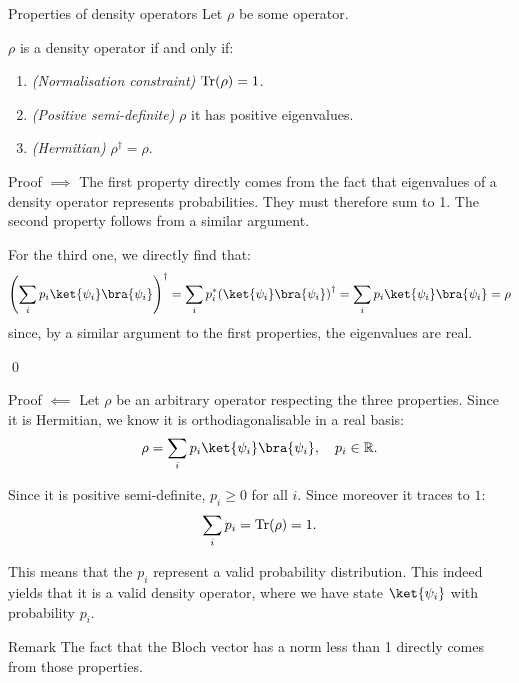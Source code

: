\documentclass[a4paper]{article}
\begin{document}
\begin{parag}{Properties of density operators}
    Let $\rho$ be some operator.

    $\rho$ is a density operator if and only if:
    \begin{enumerate}
        \item \textit{(Normalisation constraint)} $\Tr\left(\rho\right) = 1$.
        \item \textit{(Positive semi-definite)} $\rho$ it has positive eigenvalues.
        \item \textit{(Hermitian)} $\rho^{\dagger} = \rho$.
    \end{enumerate}

    \begin{subparag}{Proof $\implies$}
        The first property directly comes from the fact that eigenvalues of a density operator represents probabilities. They must therefore sum to 1. The second property follows from a similar argument.

        For the third one, we directly find that: 
        \[\left(\sum_{i} p_i \ket{\psi_i}\bra{\psi_i} \right)^{\dagger} = \sum_{i} p_i^* \left(\ket{\psi_i}\bra{\psi_i}\right)^{\dagger} = \sum_{i} p_i \ket{\psi_i}\bra{\psi_i} = \rho\]
        since, by a similar argument to the first properties, the eigenvalues are real.

        \qed
    \end{subparag}

    \begin{subparag}{Proof $\impliedby$}
        Let $\rho$ be an arbitrary operator respecting the three properties. Since it is Hermitian, we know it is orthodiagonalisable in a real basis: 
        \[\rho = \sum_{i} p_i \ket{\psi_i}\bra{\psi_i}, \mathspace p_i \in \mathbb{R}.\]

        Since it is positive semi-definite, $p_i \geq 0$ for all $i$. Since moreover it traces to $1$: 
        \[\sum_{i} p_i = \Tr\left(\rho\right) = 1.\]
        
        This means that the $p_i$ represent a valid probability distribution. This indeed yields that it is a valid density operator, where we have state $\ket{\psi_i}$ with probability $p_i$.
    \end{subparag}

    \begin{subparag}{Remark}
        The fact that the Bloch vector has a norm less than 1 directly comes from those properties.
    \end{subparag}
\end{parag}
\end{document}
